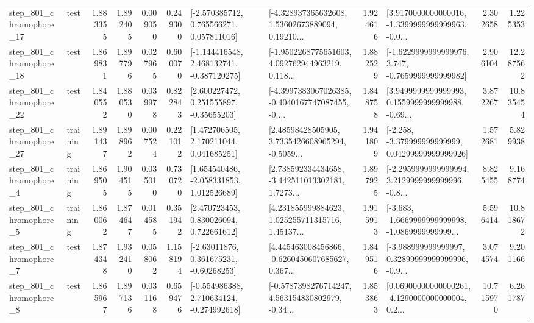 \begin{tabular}{llrrrrllrlrr}
  step\_801\_chromophore\_17 &      test &      1.883355 &    1.892405 &      0.009050 &  0.249300 &    [-2.570385712, 0.765566271, 0.057811016] &  [-4.328937365632608, 1.53602673889094, 0.19210... &       1.924616 &  [3.9170000000000016, -1.3399999999999963, -0.0... &            2.302658 &          1.225353 \\
  step\_801\_chromophore\_18 &      test &      1.869831 &    1.897796 &      0.027965 &  0.600070 &   [-1.144416548, 2.468132741, -0.387120275] &  [-1.9502268775651603, 4.092762944963219, 0.118... &       1.882529 &  [-1.6229999999999976, 3.747, -0.7659999999999982] &            2.906104 &         12.287562 \\
  step\_801\_chromophore\_22 &      test &      1.840552 &    1.880530 &      0.039978 &  0.822843 &     [2.600227472, 0.251555897, -0.35655203] &  [-4.3997383067026385, -0.4040167747087455, -0.... &       1.848758 &  [3.9499999999999993, 0.1559999999999988, -0.69... &            3.872267 &         10.835454 \\
  step\_801\_chromophore\_27 &  training &      1.891437 &    1.898962 &      0.007524 &  0.221012 &     [1.472706505, 2.170211044, 0.041685251] &  [2.48598428505905, 3.7335426608965294, -0.5059... &       1.941809 &  [-2.258, -3.379999999999999, 0.04299999999999926] &            1.572681 &          5.829938 \\
   step\_801\_chromophore\_4 &  training &      1.869505 &    1.904515 &      0.035010 &  0.730720 &    [1.654540486, -2.058331853, 1.012526689] &  [2.738592334434658, -3.442511013302181, 1.7273... &       1.897925 &  [-2.2959999999999994, 3.2129999999999996, -0.8... &            8.825455 &          9.168774 \\
   step\_801\_chromophore\_5 &  training &      1.860062 &    1.874647 &      0.014585 &  0.351942 &     [2.470723453, 0.830026094, 0.722661612] &  [4.231855999884623, 1.025255711315716, 1.45137... &       1.915913 &  [-3.683, -1.6669999999999998, -1.0869999999999... &            5.596414 &         10.818672 \\
   step\_801\_chromophore\_7 &      test &      1.874348 &    1.932410 &      0.058062 &  1.158194 &     [-2.63011876, 0.361675231, -0.60268253] &  [4.445463008456866, -0.6260450607685627, 0.367... &       1.849516 &  [-3.988999999999997, 0.32899999999999996, -0.9... &            3.074574 &          9.201166 \\
   step\_801\_chromophore\_8 &      test &      1.865967 &    1.897136 &      0.031168 &  0.659476 &   [-0.554986388, 2.710634124, -0.274992618] &  [-0.5787398276714247, 4.563154830802979, -0.34... &       1.853863 &  [0.06900000000000261, -4.1290000000000004, 0.2... &           10.715970 &          6.261787 \\

\end{tabular}

